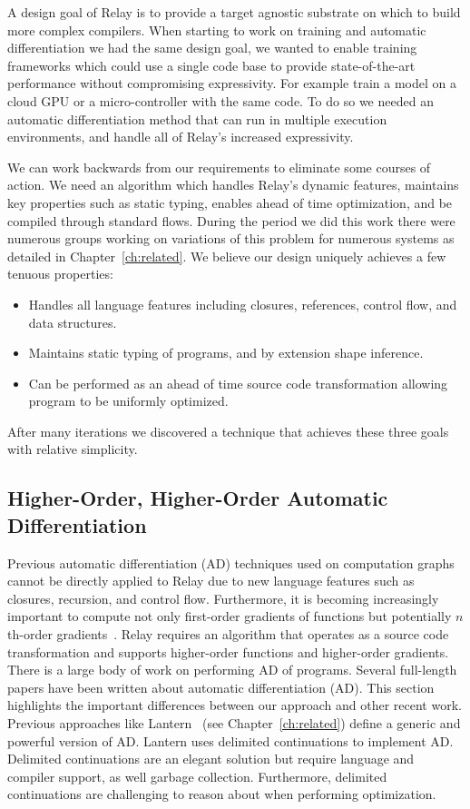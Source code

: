 A design goal of Relay is to provide a target agnostic substrate on which
  to build more complex compilers.
When starting to work on training and automatic differentiation we had
  the same design goal, we wanted to enable training frameworks which
  could use a single code base to provide state-of-the-art performance
  without compromising expressivity.
For example train a model on a cloud GPU or a micro-controller with
  the same code.
To do so we needed an automatic differentiation method that can run
  in multiple execution environments, and handle all of Relay's increased
  expressivity.

We can work backwards from our requirements to eliminate some courses
  of action.
We need an algorithm which handles Relay's dynamic features, maintains
  key properties such as static typing, enables ahead of time optimization,
  and be compiled through standard flows.
During the period we did this work there were numerous
  groups working on variations of this problem for numerous systems
  as detailed in Chapter~\ref{ch:related}.
We believe our design uniquely achieves a few tenuous properties:
\begin{itemize}
  \item Handles all language features including closures,
        references, control flow, and data structures.
  \item Maintains static typing of programs, and by extension shape inference.
  \item Can be performed as an ahead of time source code
    transformation allowing program to be uniformly optimized.
\end{itemize}

After many iterations we discovered a technique that achieves these
  three goals with relative simplicity.

\subsection{Higher-Order, Higher-Order Automatic Differentiation}
\label{sec:autodiff}

Previous automatic differentiation (AD) techniques used on
  computation graphs cannot be directly applied to Relay due to new
  language features such as closures, recursion, and control flow.
Furthermore, it is becoming increasingly important to compute not
  only first-order gradients of functions
  but potentially $n$th-order gradients~\citep{neural_ode, darts}.
Relay requires an algorithm that operates as a source code transformation
  and supports higher-order functions and higher-order gradients.
There is a large body of work on performing AD
  of programs.
Several full-length papers have been written about automatic
  differentiation (AD).
This section highlights the important differences
  between our approach and other recent work.
Previous approaches like Lantern~\citep{lantern} (see Chapter~\ref{ch:related})
  define a generic and powerful version of AD.
Lantern uses delimited continuations to implement AD.
Delimited continuations are an elegant solution
  but require language and compiler support,
  as well garbage collection.
Furthermore, delimited continuations are challenging
  to reason about when performing optimization.

